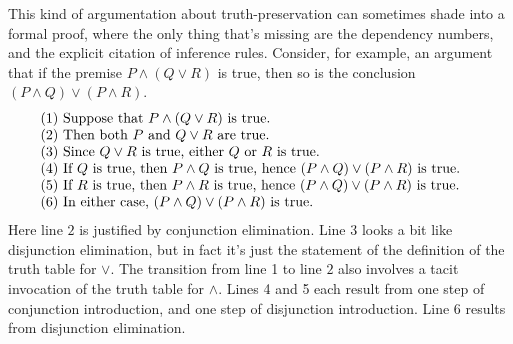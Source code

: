 This kind of argumentation about truth-preservation can sometimes
shade into a formal proof, where the only thing that's missing are the
dependency numbers, and the explicit citation of inference rules.
Consider, for example, an argument that if the premise
$P\wedge (Q\vee R)$ is true, then so is the conclusion
$(P\wedge Q)\vee (P\wedge R)$.
\[ \begin{array}{p{11cm}}
     $(1)$ Suppose that $P\wedge (Q\vee R)$ is true.  \\
     $(2)$ Then both $P$ and $Q\vee R$ are true. \\
     $(3)$ Since $Q\vee R$ is true, either $Q$ or $R$ is true. \\
     $(4)$ If $Q$ is true, then $P\wedge Q$ is true, hence $(P\wedge
     Q)\vee (P\wedge R)$ is true.  \\
     $(5)$ If $R$ is true, then $P\wedge R$ is true, hence $(P\wedge
     Q)\vee (P\wedge R)$ is true.  \\
     $(6)$ In either case, $(P\wedge Q)\vee (P\wedge R)$ is
     true.  \end{array} \]
Here line $2$ is justified by conjunction elimination.  Line 3 looks a
bit like disjunction elimination, but in fact it's just the statement
of the definition of the truth table for $\vee$.  The transition from
line 1 to line $2$ also involves a tacit invocation of the truth table
for $\wedge$.  Lines 4 and 5 each result from one step
of conjunction introduction, and one step of disjunction
introduction.  Line 6 results from disjunction elimination.

